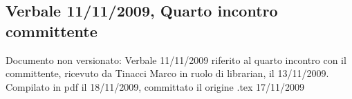 \subsection{Verbale 11/11/2009, Quarto incontro committente}
Documento non versionato: Verbale 11/11/2009 riferito al quarto incontro con il 
committente, ricevuto da Tinacci Marco in ruolo di librarian, il 13/11/2009.
Compilato in pdf il 18/11/2009, committato il origine .tex 17/11/2009
